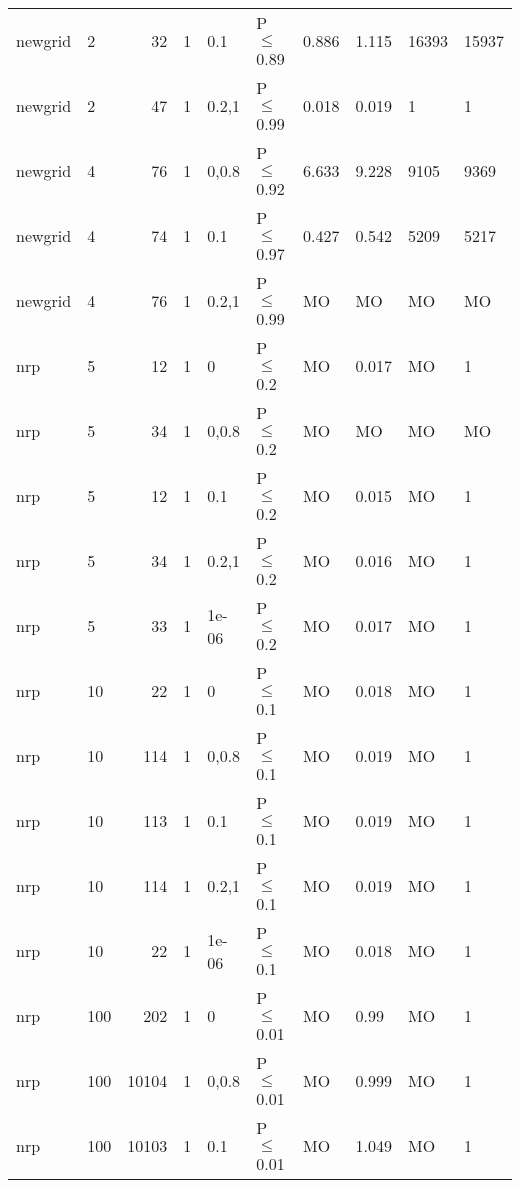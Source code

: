 \begin{longtable}{llrrllllll}
 newgrid       & 2        &     	32 & 1 & 0.1   & P$\leq$0.89  & 0.886    & 1.115    & 16393   & 15937   \\
 newgrid       & 2        &     	47 & 1 & 0.2,1 & P$\leq$0.99  & 0.018    & 0.019    & 1       & 1       \\
 newgrid       & 4        &     	76 & 1 & 0,0.8 & P$\leq$0.92  & 6.633    & 9.228    & 9105    & 9369    \\
 newgrid       & 4        &     	74 & 1 & 0.1   & P$\leq$0.97  & 0.427    & 0.542    & 5209    & 5217    \\
 newgrid       & 4        &     	76 & 1 & 0.2,1 & P$\leq$0.99  & MO       & MO       & MO      & MO      \\
 nrp           & 5        &     	12 & 1 & 0     & P$\leq$0.2   & MO       & 0.017    & MO      & 1       \\
 nrp           & 5        &     	34 & 1 & 0,0.8 & P$\leq$0.2   & MO       & MO       & MO      & MO      \\
 nrp           & 5        &     	12 & 1 & 0.1   & P$\leq$0.2   & MO       & 0.015    & MO      & 1       \\
 nrp           & 5        &     	34 & 1 & 0.2,1 & P$\leq$0.2   & MO       & 0.016    & MO      & 1       \\
 nrp           & 5        &     	33 & 1 & 1e-06 & P$\leq$0.2   & MO       & 0.017    & MO      & 1       \\
 nrp           & 10       &     	22 & 1 & 0     & P$\leq$0.1   & MO       & 0.018    & MO      & 1       \\
 nrp           & 10       &    	114 & 1 & 0,0.8 & P$\leq$0.1   & MO       & 0.019    & MO      & 1       \\
 nrp           & 10       &    	113 & 1 & 0.1   & P$\leq$0.1   & MO       & 0.019    & MO      & 1       \\
 nrp           & 10       &    	114 & 1 & 0.2,1 & P$\leq$0.1   & MO       & 0.019    & MO      & 1       \\
 nrp           & 10       &     	22 & 1 & 1e-06 & P$\leq$0.1   & MO       & 0.018    & MO      & 1       \\
 nrp           & 100      &    	202 & 1 & 0     & P$\leq$0.01  & MO       & 0.99     & MO      & 1       \\
 nrp           & 100      &  	10104 & 1 & 0,0.8 & P$\leq$0.01  & MO       & 0.999    & MO      & 1       \\
 nrp           & 100      &  	10103 & 1 & 0.1   & P$\leq$0.01  & MO       & 1.049    & MO      & 1       \\

\end{longtable}
